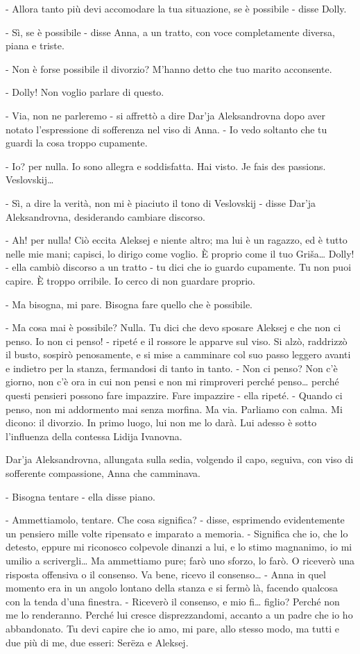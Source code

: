 \label{xxiv-4} 

- Allora tanto più devi accomodare la tua situazione, se è possibile - disse Dolly. 

- Sì, se è possibile - disse Anna, a un tratto, con voce completamente diversa, piana e triste. 

- Non è forse possibile il divorzio? M'hanno detto che tuo marito acconsente. 

- Dolly! Non voglio parlare di questo. 

- Via, non ne parleremo - si affrettò a dire Dar'ja Aleksandrovna dopo aver notato l'espressione di sofferenza nel viso di Anna. - Io vedo soltanto che tu guardi la cosa troppo cupamente. 

- Io? per nulla. Io sono allegra e soddisfatta. Hai visto. Je fais des passions. Veslovskij\ldots{} 

- Sì, a dire la verità, non mi è piaciuto il tono di Veslovskij - disse Dar'ja Aleksandrovna, desiderando cambiare discorso. 

- Ah! per nulla! Ciò eccita Aleksej e niente altro; ma lui è un ragazzo, ed è tutto nelle mie mani; capisci, lo dirigo come voglio. È proprio come il tuo Griša\ldots{} Dolly! - ella cambiò discorso a un tratto - tu dici che io guardo cupamente. Tu non puoi capire. È troppo orribile. Io cerco di non guardare proprio. 

- Ma bisogna, mi pare. Bisogna fare quello che è possibile. 

- Ma cosa mai è possibile? Nulla. Tu dici che devo sposare Aleksej e che non ci penso. Io non ci penso! - ripeté e il rossore le apparve sul viso. Si alzò, raddrizzò il busto, sospirò penosamente, e si mise a camminare col suo passo leggero avanti e indietro per la stanza, fermandosi di tanto in tanto. - Non ci penso? Non c'è giorno, non c'è ora in cui non pensi e non mi rimproveri perché penso\ldots{} perché questi pensieri possono fare impazzire. Fare impazzire - ella ripeté. - Quando ci penso, non mi addormento mai senza morfina. Ma via. Parliamo con calma. Mi dicono: il divorzio. In primo luogo, lui non me lo darà. Lui adesso è sotto l'influenza della contessa Lidija Ivanovna. 

Dar'ja Aleksandrovna, allungata sulla sedia, volgendo il capo, seguiva, con viso di sofferente compassione, Anna che camminava. 

- Bisogna tentare - ella disse piano. 

- Ammettiamolo, tentare. Che cosa significa? - disse, esprimendo evidentemente un pensiero mille volte ripensato e imparato a memoria. - Significa che io, che lo detesto, eppure mi riconosco colpevole dinanzi a lui, e lo stimo magnanimo, io mi umilio a scrivergli\ldots{} Ma ammettiamo pure; farò uno sforzo, lo farò. O riceverò una risposta offensiva o il consenso. Va bene, ricevo il consenso\ldots{} - Anna in quel momento era in un angolo lontano della stanza e si fermò là, facendo qualcosa con la tenda d'una finestra. - Riceverò il consenso, e mio fi\ldots{} figlio? Perché non me lo renderanno. Perché lui cresce disprezzandomi, accanto a un padre che io ho abbandonato. Tu devi capire che io amo, mi pare, allo stesso modo, ma tutti e due più di me, due esseri: Serëza e Aleksej. 

